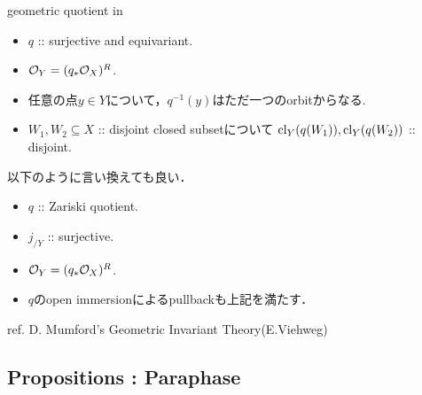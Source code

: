 \documentclass[a4paper, dvipdfmx]{jsarticle}
\begin{document}
\begin{Def}
\end{Def}

\begin{Remark}
    geometric quotient in \cite{GIT}
    \begin{itemize}
        \item $q$ :: surjective and equivariant.
        \item $\mathcal{O}_{Y}=(q_* \mathcal{O}_X)^{R}$.
        \item 任意の点$y \in Y$について，$q^{-1}(y)$はただ一つのorbitからなる.
        \item
            $W_1, W_2 \subseteq X$ :: disjoint closed subsetについて
            $\operatorname{cl}_Y(q(W_1)), \operatorname{cl}_Y(q(W_2))$ :: disjoint.
    \end{itemize}

    以下のように言い換えても良い．
    \begin{itemize}
        \item $q$ :: Zariski quotient.
        \item $j_{/Y}$ :: surjective.
        \item $\mathcal{O}_{Y}=(q_* \mathcal{O}_X)^{R}$.
        \item $q$のopen immersionによるpullbackも上記を満たす．
    \end{itemize}
    ref. D. Mumford's Geometric Invariant Theory(E.Viehweg)
\end{Remark}

\subsection{Propositions : Paraphase}



\end{document}
